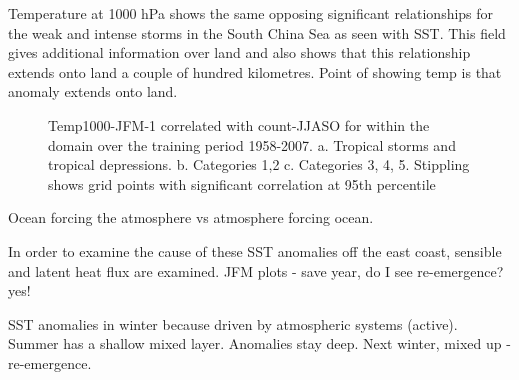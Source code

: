 Temperature at 1000 hPa shows the same opposing significant relationships for the weak and intense storms in the South China Sea as seen with SST. This field gives additional information over land and also shows that this relationship extends onto land a couple of hundred kilometres. Point of showing temp is that anomaly extends onto land.

\begin{figure}
	\centering
	\caption{Temp1000-JFM-1 correlated with count-JJASO for within the domain over the training period 1958-2007. a. Tropical storms and tropical depressions. b. Categories 1,2 c. Categories 3, 4, 5. Stippling shows grid points with significant correlation at 95th percentile} \label{fig:corr_prevJFM_temp} 
\end{figure} 


Ocean forcing the atmosphere vs atmosphere forcing ocean.


In order to examine the cause of these SST anomalies off the east coast, sensible and latent heat flux are examined.
JFM plots - save year, do I see re-emergence? yes!

SST anomalies in winter because driven by atmospheric systems (active). Summer has a shallow mixed layer. Anomalies stay deep. Next winter, mixed up - re-emergence.

